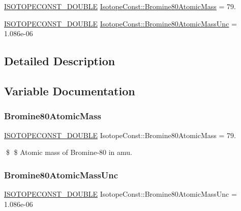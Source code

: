\begin{DoxyCompactItemize}
\item 
\mbox{\hyperlink{group___isotope_const-_macros_ga8f45a7272ce02c0b4c65c44636ed719a}{I\+S\+O\+T\+O\+P\+E\+C\+O\+N\+S\+T\+\_\+\+D\+O\+U\+B\+LE}} \mbox{\hyperlink{group___isotope_const-_bromine-_br80_gaa3e7f8537f13c7d49e9dd32a730f2724}{Isotope\+Const\+::\+Bromine80\+Atomic\+Mass}} = 79.
\item 
\mbox{\hyperlink{group___isotope_const-_macros_ga8f45a7272ce02c0b4c65c44636ed719a}{I\+S\+O\+T\+O\+P\+E\+C\+O\+N\+S\+T\+\_\+\+D\+O\+U\+B\+LE}} \mbox{\hyperlink{group___isotope_const-_bromine-_br80_ga2daf00294dc6508c6cb881fb5f0dd9c5}{Isotope\+Const\+::\+Bromine80\+Atomic\+Mass\+Unc}} = 1.\+086e-\/06
\end{DoxyCompactItemize}


\subsection{Detailed Description}


\subsection{Variable Documentation}
\mbox{\label{group___isotope_const-_bromine-_br80_gaa3e7f8537f13c7d49e9dd32a730f2724}} 
\subsubsection{\texorpdfstring{Bromine80\+Atomic\+Mass}{Bromine80AtomicMass}}
{\footnotesize\ttfamily \mbox{\hyperlink{group___isotope_const-_macros_ga8f45a7272ce02c0b4c65c44636ed719a}{I\+S\+O\+T\+O\+P\+E\+C\+O\+N\+S\+T\+\_\+\+D\+O\+U\+B\+LE}} Isotope\+Const\+::\+Bromine80\+Atomic\+Mass = 79.}

\$ \$ Atomic mass of Bromine-\/80 in amu. \mbox{\label{group___isotope_const-_bromine-_br80_ga2daf00294dc6508c6cb881fb5f0dd9c5}} 
\subsubsection{\texorpdfstring{Bromine80\+Atomic\+Mass\+Unc}{Bromine80AtomicMassUnc}}
{\footnotesize\ttfamily \mbox{\hyperlink{group___isotope_const-_macros_ga8f45a7272ce02c0b4c65c44636ed719a}{I\+S\+O\+T\+O\+P\+E\+C\+O\+N\+S\+T\+\_\+\+D\+O\+U\+B\+LE}} Isotope\+Const\+::\+Bromine80\+Atomic\+Mass\+Unc = 1.\+086e-\/06}

